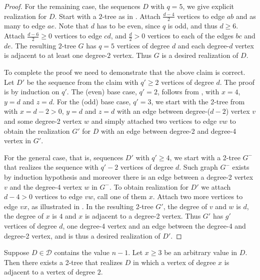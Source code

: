 \documentclass[lotsofwhite,charterfonts]{patmorin}
\begin{document}
\begin{proof}
For the remaining case, the sequences $D$ with $q=5$, we give explicit
realization for $D$. Start with a $2$-tree as in . Attach
$\frac{d-4}{2}$ vertices to edge $ab$ and as many to edge $ae$. Note
that $d$ has to be even, since $q$ is odd, and thus $d\geq 6$. Attach
$\frac{d-6}{2}\geq 0$ vertices to edge $cd$, and $\frac{d}{2}>0$
vertices to each of the edges $bc$ and $de$. The resulting $2$-tree
$G$ has $q=5$ vertices of degree $d$ and each degree-$d$ vertex is
adjacent to at least one degree-$2$ vertex. Thus $G$ is a desired
realization of $D$.

To complete the proof we need to demonstrate that the above claim is
correct. Let $D'$ be the sequence from the claim with $q'\geq 2$
vertices of degree $d$. The proof is by induction on $q'$. The (even)
base case, $q'=2$, follows from , with $x=4$, $y=d$
and $z=d$. For the (odd) base case, $q'=3$, we start with the 2-tree
from   with $x=d-2>0$, $y=d$ and $z=d$ with an edge
between degree-($d-2$) vertex $v$ and some degree-2 vertex $w$ and
simply attached two vertices to edge $vw$ to obtain the realization
$G'$ for $D$ with an edge between degree-2 and degree-4 vertex in
$G'$.

For the general case, that is, sequences $D'$ with $q'\geq 4$, we
start with a 2-tree $G^-$ that realizes the sequence with $q'-2$
vertices of degree $d$. Such graph $G^-$ exists by induction
hypothesis and moreover there is an edge between a degree-2 vertex $v$
and the degree-4 vertex $w$ in $G^-$. To obtain realization for $D'$
we attach $d-4>0$ vertices to edge $vw$, call one of them $x$. Attach
two more vertices to edge $vx$, as illustrated in . In the
resulting 2-tree $G'$, the degree of $v$ and $w$ is $d$, the degree of
$x$ is $4$ and $x$ is adjacent to a degree-2 vertex. Thus $G'$ has
$g'$ vertices of degree $d$, one degree-4 vertex and an edge between
the degree-4 and degree-2 vertex, and is thus a desired realization of
$D'$.  
\end{proof}

\begin{lem}
Suppose $D\in \mathcal{D}$ contains the value $n-1$. Let $x \geq 3$ be
an arbitrary value in $D$.  Then there exists a 2-tree that realizes
$D$ in which a vertex of degree $x$ is adjacent to a vertex of degree
$2$.
\end{lem}
\end{document}
